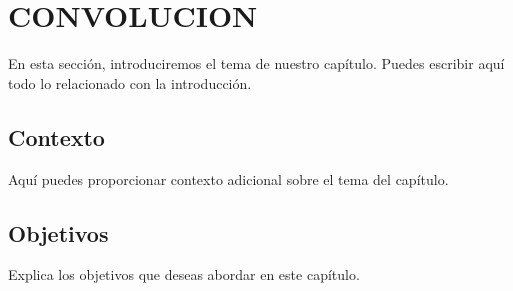 
\chapter{CONVOLUCION}
En esta sección, introduciremos el tema de nuestro capítulo. Puedes escribir aquí todo lo relacionado con la introducción.

\section{Contexto}

Aquí puedes proporcionar contexto adicional sobre el tema del capítulo.

\section{Objetivos}

Explica los objetivos que deseas abordar en este capítulo.


